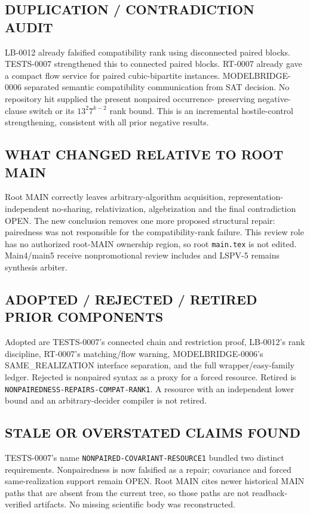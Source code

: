 \documentclass[11pt]{article}
\begin{document}
\subsection*{DUPLICATION / CONTRADICTION AUDIT}
LB-0012 already falsified compatibility rank using disconnected paired
blocks.  TESTS-0007 strengthened this to connected paired blocks.  RT-0007
already gave a compact flow service for paired cubic-bipartite instances.
MODELBRIDGE-0006 separated semantic compatibility communication from SAT
decision.  No repository hit supplied the present nonpaired occurrence-
preserving negative-clause switch or its $13^2 7^{k-2}$ rank bound.  This is
an incremental hostile-control strengthening, consistent with all prior
negative results.

\subsection*{WHAT CHANGED RELATIVE TO ROOT MAIN}
Root MAIN correctly leaves arbitrary-algorithm acquisition, representation-
independent no-sharing, relativization, algebrization and the final
contradiction OPEN.  The new conclusion removes one more proposed structural
repair: pairedness was not responsible for the compatibility-rank failure.
This review role has no authorized root-MAIN ownership region, so root
\texttt{main.tex} is not edited.  Main4/main5 receive nonpromotional review
includes and LSPV-5 remains synthesis arbiter.

\subsection*{ADOPTED / REJECTED / RETIRED PRIOR COMPONENTS}
Adopted are TESTS-0007's connected chain and restriction proof,
LB-0012's rank discipline, RT-0007's matching/flow warning,
MODELBRIDGE-0006's SAME\_REALIZATION interface separation, and the full
wrapper/easy-family ledger.  Rejected is nonpaired syntax as a proxy for a
forced resource.  Retired is
\texttt{NONPAIREDNESS-REPAIRS-COMPAT-RANK1}.  A resource with an independent
lower bound and an arbitrary-decider compiler is not retired.

\subsection*{STALE OR OVERSTATED CLAIMS FOUND}
TESTS-0007's name \texttt{NONPAIRED-COVARIANT-RESOURCE1} bundled two distinct
requirements.  Nonpairedness is now falsified as a repair; covariance and
forced same-realization support remain OPEN.  Root MAIN cites newer
historical MAIN paths that are absent from the current tree, so those paths
are not readback-verified artifacts.  No missing scientific body was
reconstructed.
\end{document}
